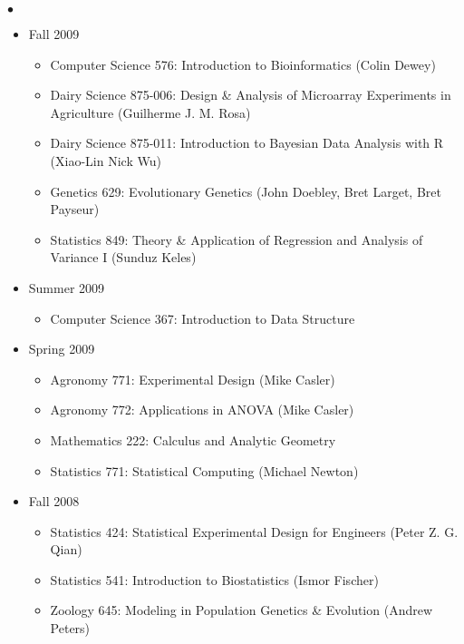 \documentclass[margin,line,10pt]{res}
\newenvironment{list2}{
  \begin{list}{$\bullet$}{%
      \setlength{\itemsep}{0in}
      \setlength{\parsep}{0in} \setlength{\parskip}{0in}
      \setlength{\topsep}{0in} \setlength{\partopsep}{0in} 
      \setlength{\leftmargin}{0.2in}}}{\end{list}}
\begin{document}
\begin{resume}
\begin{list2}
\begin{itemize}
\begin{itemize}
\item    Animal Sciences 875: Linear Models with Applications in Biology and Agriculture (Daniel Gianola)
\item    Statistics 850: Theory \& Application of Regression and Analysis of Variance II (Wei-Yin Loh)

\end{itemize}


\item Fall 2009
\begin{itemize}
\item    Computer Science 576: Introduction to Bioinformatics (Colin Dewey)
\item    Dairy Science 875-006: Design \& Analysis of Microarray Experiments in Agriculture (Guilherme J. M. Rosa)
\item    Dairy Science 875-011: Introduction to Bayesian Data Analysis with R (Xiao-Lin Nick Wu)
\item    Genetics 629: Evolutionary Genetics (John Doebley, Bret Larget, Bret Payseur)
\item    Statistics 849: Theory \& Application of Regression and Analysis of Variance I (Sunduz Keles)
\end{itemize}




\item Summer 2009
\begin{itemize}
\item Computer Science 367: Introduction to Data Structure
\end{itemize}

\item Spring 2009
\begin{itemize}
\item Agronomy 771: Experimental Design (Mike Casler)
\item Agronomy 772: Applications in ANOVA (Mike Casler)
\item Mathematics 222: Calculus and Analytic Geometry
\item Statistics 771: Statistical Computing (Michael Newton)
\end{itemize}


\item Fall 2008
\begin{itemize}
\item Statistics 424: Statistical Experimental Design for Engineers (Peter Z. G. Qian)
\item Statistics 541: Introduction to Biostatistics (Ismor Fischer)
\item Zoology 645: Modeling in Population Genetics \& Evolution (Andrew Peters)
\end{itemize}


\end{itemize}
\end{list2}
\end{resume}
\end{document}
